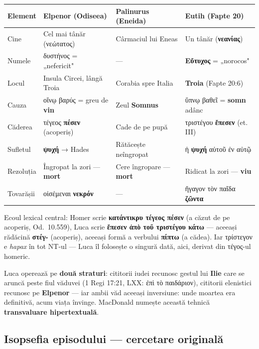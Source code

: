 \documentclass[12pt,a4paper,twoside,openany]{book}
\begin{document}
\begin{center}
\footnotesize
\begin{tabular}{L{1.8cm}L{3.2cm}L{3.2cm}L{3.8cm}}
\toprule
{}
\textbf{Element} & \textbf{Elpenor (Odiseea)} & \textbf{Palinurus (Eneida)} & \textbf{Eutih (Fapte 20)} \\
\midrule
Cine & Cel mai tânăr (νεώτατος) & Cârmaciul lui Eneas & Un tânăr (\textbf{νεανίας}) \\
Numele & δυστήνος = „nefericit" & --- & \textbf{Εὔτυχος} = „norocos" \\
Locul & Insula Circei, lângă Troia & Corabia spre Italia & \textbf{Troia} (Fapte 20:6) \\
Cauza & οἴνῳ βαρύς = greu de \textbf{vin} & Zeul \textbf{Somnus} & ὕπνῳ βαθεῖ = \textbf{somn} adânc \\
Căderea & τέγεος \textbf{πέσεν} (acoperiș) & Cade de pe pupă & τριστέγου \textbf{ἔπεσεν} (et. III) \\
Sufletul & \textbf{ψυχή} → Hades & Rătăcește neîngropat & ἡ \textbf{ψυχή} αὐτοῦ ἐν αὐτῷ \\
Rezoluția & Îngropat la zori --- \textbf{mort} & Cere îngropare --- \textbf{mort} & Ridicat la zori --- \textbf{viu} \\
Tovarășii & οἰσέμεναι \textbf{νεκρόν} & --- & ἤγαγον τὸν παῖδα \textbf{ζῶντα} \\
\bottomrule
\end{tabular}
\end{center}
\normalsize

Ecoul lexical central: Homer scrie \textbf{κατάντικρυ τέγεος πέσεν} (a căzut de pe acoperiș, Od.\ 10.559), Luca scrie \textbf{ἔπεσεν ἀπὸ τοῦ τριστέγου κάτω} --- aceeași rădăcină \textbf{στέγ-} (acoperiș), aceeași formă a verbului \textbf{πίπτω} (a cădea). Iar τρίστεγον e \textit{hapax} în tot NT-ul --- Luca îl folosește o singură dată, aici, derivat din τέγος-ul homeric.

Luca operează pe \textbf{două straturi}: cititorii iudei recunosc gestul lui \textbf{Ilie} care se aruncă peste fiul văduvei (1 Regi 17:21, LXX: ἐπὶ τὸ παιδάριον), cititorii elenistici recunosc pe \textbf{Elpenor} --- iar ambii văd aceeași inversiune: unde moartea era definitivă, acum viața învinge. MacDonald numește această tehnică \textbf{transvaluare hipertextuală}.

\subsection*{Isopsefia episodului --- cercetare originală}
\end{document}
